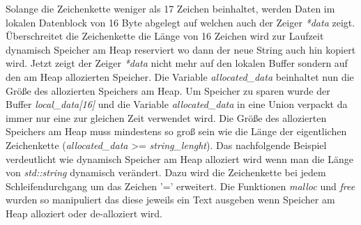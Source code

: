 \documentclass[MES,Master,ngerman]{twbook}%
\begin{document}
\begin{figure}[!htb]
	\centering
	\begin{subfigure}[b]{0.5\textwidth}
		
		\label{lst:9}
	\end{subfigure}
\end{figure}

Solange die Zeichenkette weniger als 17 Zeichen beinhaltet, werden Daten im lokalen Datenblock von 16 Byte abgelegt auf welchen auch der Zeiger \textit{*data} zeigt. Überschreitet die Zeichenkette die Länge von 16 Zeichen wird zur Laufzeit dynamisch Speicher am Heap reserviert wo dann der neue String auch hin kopiert wird. Jetzt zeigt der Zeiger \textit{*data} nicht mehr auf den lokalen Buffer sondern auf den am Heap allozierten Speicher.
Die Variable \textit{allocated\_data} beinhaltet nun die Größe des allozierten Speichers am Heap. Um Speicher zu sparen wurde der Buffer \textit{local\_data[16]} und die Variable \textit{allocated\_data} in eine Union verpackt da immer nur eine zur gleichen Zeit verwendet wird. Die Größe des allozierten Speichers am Heap muss mindestens so groß sein wie die Länge der eigentlichen Zeichenkette (\textit{allocated\_data} >= \textit{string\_lenght}).\newline\newline
Das nachfolgende Beispiel verdeutlicht wie dynamisch Speicher am Heap alloziert wird wenn man die Länge von \textit{std::string} dynamisch verändert. Dazu wird die Zeichenkette bei jedem Schleifendurchgang um das Zeichen '=' erweitert. Die Funktionen \textit{malloc} und \textit{free} wurden so manipuliert das diese jeweils ein Text ausgeben wenn Speicher am Heap alloziert oder de-alloziert wird.
\end{document}
